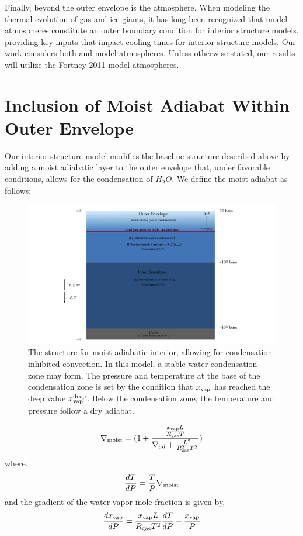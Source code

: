 \documentclass[11pt]{ucscthesisbs}
\begin{document}
Finally, beyond the outer envelope is the atmosphere. When modeling the thermal evolution of gas and ice giants, it has long been recognized that model atmospheres constitute an outer boundary condition for interior structure models, providing key inputs that impact cooling times for interior structure models. Our work considers both \citep{graboske_1975} and \citep{fortney_2011} model atmospheres. Unless otherwise stated, our results will utilize the Fortney 2011 model atmospheres. 

\section{Inclusion of Moist Adiabat Within Outer Envelope}
Our interior structure model modifies the baseline structure described above by adding a moist adiabatic layer to the outer envelope that, under favorable conditions, allows for the condensation of $H_{2}O$. We define the moist adiabat as follows:

\begin{figure}[ht!]
 \centerline{
  \includegraphics[width=8.0in]{figures/moist_adiabat_structure.png}
 }
\caption[Interior Structure for Moist Adiabat]
{The structure for moist adiabatic interior, allowing for condensation-inhibited convection. In this model, a stable water condensation zone may form. The pressure and temperature at the base of the condensation zone is set by the condition that $x_{\rm vap}$ has reached the deep value $x_{\rm vap}^{\rm deep}$. Below the condensation zone, the temperature and pressure follow a dry adiabat.}
\label{fig:moist_interior}
\end{figure}


\begin{equation}
\nabla_{\rm moist} = (1 + \frac{\frac{x_{\rm vap} L}{R_{\rm gas}T}}{\nabla_{ad} + \frac{L^2}{R_{\rm gas}^2 T^2}} )
\end{equation}
where,
\begin{equation}
\frac{dT}{dP} =\frac{T}{P}\nabla_{\rm moist}
\end{equation}
and the gradient of the water vapor mole fraction is given by,
\begin{equation}
\frac{d x_{\rm vap}}{dP} = \frac{x_{\rm vap} L}{R_{\rm gas} T^2} \frac{dT}{dP} - \frac{x_{\rm vap}}{P}
\end{equation}
\end{document}
